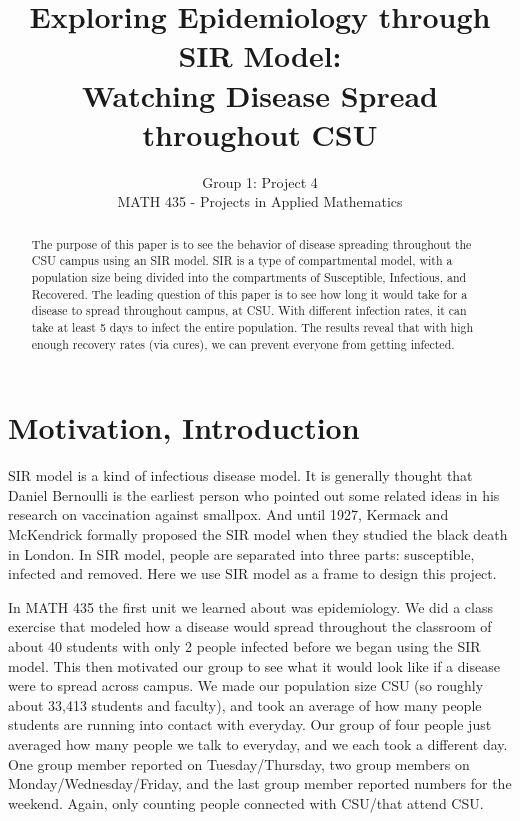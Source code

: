 \documentclass[12pt]{article}
\begin{document}
\title{Exploring Epidemiology through SIR Model:\\
Watching Disease Spread throughout CSU}
\author{Group 1: Project 4\\
MATH 435 - Projects in Applied Mathematics}
\maketitle
 
\begin{abstract}
The purpose of this paper is to see the behavior of disease spreading throughout the CSU campus using an SIR model. SIR is a type of compartmental model, with a population size being divided into the compartments of Susceptible, Infectious, and Recovered. The leading question of this paper is to see how long it would take for a disease to spread throughout campus, at CSU. With different infection rates, it can take at least 5 days to infect the entire population. The results reveal that with high enough recovery rates (via cures), we can prevent everyone from getting infected.
\end{abstract}

\section{Motivation, Introduction}
SIR model is a kind of infectious disease model. It is generally thought that Daniel Bernoulli is the earliest person who pointed out some related ideas in his research on vaccination against smallpox. And until 1927, Kermack and McKendrick formally proposed the SIR model when they studied the black death in London. In SIR model, people are separated into three parts: susceptible, infected and removed. Here we use SIR model as a frame to design this project. 

In MATH 435 the first unit we learned about was epidemiology. We did a class exercise that modeled how a disease would spread throughout the classroom of about 40 students with only 2 people infected before we began using the SIR model. This then motivated our group to see  what it would look like if a disease were to spread across campus. We made our population size CSU (so roughly about 33,413 students and faculty), and took an average of how many people students are running into contact with everyday. Our group of four people just averaged how many people we talk to everyday, and we each took a different day. One group member reported on Tuesday/Thursday, two group members on Monday/Wednesday/Friday, and the last group member reported numbers for the weekend. Again, only counting people connected with CSU/that attend CSU. 
\end{document}

